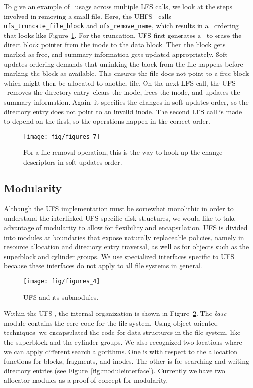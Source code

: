 To give an example of \chdesc\ usage across multiple LFS calls, we look at the
steps involved in removing a small file. Here, the UHFS \module\ calls
\texttt{ufs\_truncate\_file\_block} and \texttt{ufs\_remove\_name}, which
results in a \chdesc\ ordering that looks like Figure~\ref{fig:rmchdescs}.
For the truncation, UFS first generates a \chdesc\ to erase the direct block
pointer from the inode to the data block. Then the block gets marked as free,
and summary information gets updated appropriately. Soft updates ordering
demands that unlinking the block from the file happens before marking the
block as available. This ensures the file does not point to a free block which
might then be allocated to another file. On the next LFS call, the UFS
\module\ removes the directory entry, clears the inode, frees the inode, and
updates the summary information. Again, it specifies the changes in soft
updates order, so the directory entry does not point to an invalid inode. The
second LFS call is made to depend on the first, so the operations happen in
the correct order.

\begin{figure}[htb]
  \centering
  \texttt{[image: fig/figures\_7]}
  \caption{\label{fig:rmchdescs} For a file removal operation, this is the
	  way to hook up the change descriptors in soft updates order.}
\end{figure}

\subsection {Modularity}
\label{sec:implementation:modularity}
Although the UFS implementation must be somewhat monolithic in order to
understand the interlinked UFS-specific disk structures, we would like to take
advantage of modularity to allow for flexibility and encapsulation. UFS is
divided into modules at boundaries that expose naturally replaceable policies,
namely in resource allocation and directory entry traversal, as well as for
objects such as the superblock and cylinder groups. We use specialized
interfaces specific to UFS, because these interfaces do not apply to all file
systems in general.

\begin{figure}[htb]
  \centering
  \texttt{[image: fig/figures\_4]}
  \caption{\label{fig:ufsmodules} UFS and its submodules.}
\end{figure}

Within the UFS \module, the internal organization is shown in
Figure~\ref{fig:ufsmodules}. The \emph{base} module contains the core code for
the file system. Using object-oriented techniques, we encapsulated the code
for data structures in the file system, like the superblock and the cylinder
groups. We also recognized two locations where we can apply different search
algorithms. One is with respect to the allocation functions for blocks,
fragments, and inodes. The other is for searching and writing directory entries
(see Figure~\ref{fig:moduleinterface}). Currently we have two allocator modules
as a proof of concept for modularity.

